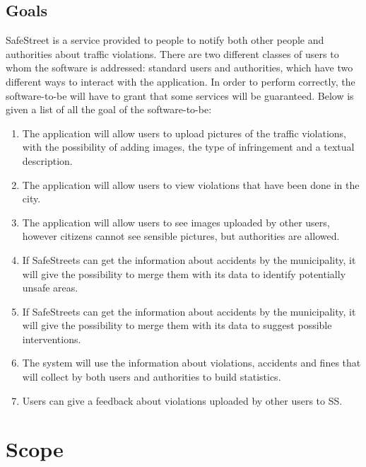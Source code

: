 \documentclass[a4paper, hidelinks, 12pt]{report}
\newcommand\goal[1]{\item[{[G#1]}] }
\begin{document}
        \subsection{Goals}\label{subsec:goals}
            SafeStreet is a service provided to people to notify both other people and authorities about traffic violations. There are two different classes of users to whom the software is addressed: standard users and authorities, which have two different ways to interact with the application.
            In order to perform correctly, the software-to-be will have to grant that some services will be guaranteed. Below is given a list of all the goal of the software-to-be:
            \begin{enumerate}
                \goal{1} The application will allow users to upload pictures of the traffic violations, with the possibility of adding images, the type of infringement and a textual description.
                \goal{2} The application will allow users to view violations that have been done in the city.
                \goal{3} The application will allow users to see images uploaded by other users, however citizens cannot see sensible pictures, but authorities are allowed.
                \goal{4} If SafeStreets can get the information about accidents by the municipality, it will give the possibility to merge them with its data to identify potentially unsafe areas.
                \goal{5} If SafeStreets can get the information about accidents by the municipality, it will give the possibility to merge them with its data to suggest possible interventions.
                \goal{6} The system will use the information about violations, accidents and fines that will collect by both users and authorities to build statistics.
                \goal{7} Users can give a feedback about violations uploaded by other users to SS.
            \end{enumerate}
	\section{Scope}\label{sec:scope}
\end{document}
